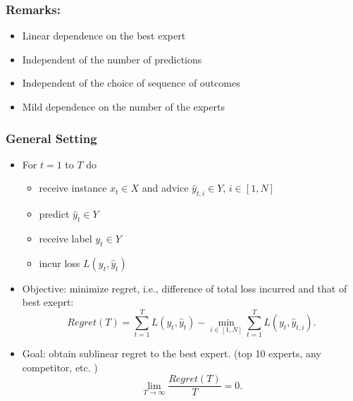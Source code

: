\documentclass{beamer}
\begin{document}
\begin{frame}
\frametitle{Remarks:}
\begin{itemize}
\item Linear dependence on the best expert
\pause
\item Independent of the number of predictions
\pause
\item Independent of the choice of sequence of outcomes
\pause
\item Mild dependence on the number of the experts
\end{itemize}


\end{frame}







\begin{frame}
\frametitle{General Setting}
\begin{itemize}
\item{For $t = 1$ to $T$ do}
	\begin{itemize}
	\item{receive instance $x_t\in X$ and advice $\hat{y}_{t,i}\in Y$, $i\in [1,N]$}
	\item{predict $\hat{y}_t\in Y$}
	\item{receive label $y_t\in Y$}
	\item{incur loss $L(y_t,\hat{y}_t)$}
	\end{itemize}
\pause
\item {\color{red}Objective:} minimize regret, i.e., difference of total loss incurred and that of best exeprt:
$$Regret(T) = \sum_{t=1}^TL(y_t,\hat{y}_t)-\min_{i\in[1,N]}\sum_{t=1}^TL(y_t,\hat{y}_{t,i}).$$
\pause	
\item Goal: obtain {\color{red}sublinear regret} to the {\color{red}best expert}. (top 10 experts, any competitor, etc. )
$$\lim_{T\to \infty}\frac{Regret(T)}{T} = 0.$$
\end{itemize}


\end{frame}
\end{document}
